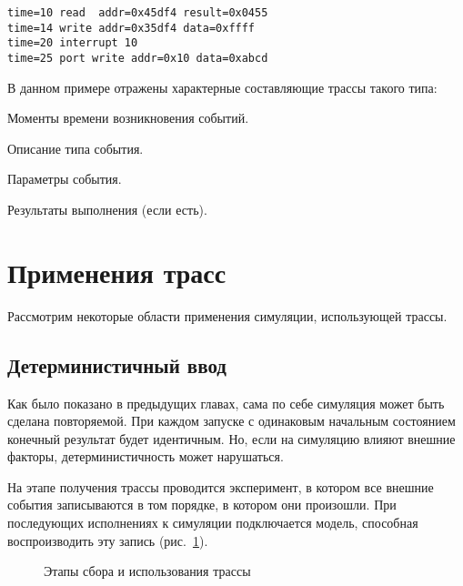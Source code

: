 \begin{lstlisting}
time=10 read  addr=0x45df4 result=0x0455
time=14 write addr=0x35df4 data=0xffff
time=20 interrupt 10
time=25 port write addr=0x10 data=0xabcd
\end{lstlisting}

В данном примере отражены характерные составляющие трассы такого типа:
\begin{itemize*}
    \item Моменты времени возникновения событий.
    \item Описание типа события.
    \item Параметры события.
    \item Результаты выполнения (если есть).
\end{itemize*}

\section{Применения трасс}

Рассмотрим некоторые области применения симуляции, использующей трассы.

\subsection{Детерминистичный ввод}

Как было показано в предыдущих главах, сама по себе симуляция может быть сделана повторяемой. При каждом запуске с одинаковым начальным состоянием конечный результат будет идентичным. Но, если на симуляцию влияют внешние факторы, детерминистичность может нарушаться.

На этапе получения трассы проводится эксперимент, в котором все внешние события записываются в том порядке, в котором они произошли. При последующих исполнениях к симуляции подключается модель, способная воспроизводить эту запись (рис.~\ref{fig:trace-collection}).

\begin{figure}[htp]
    \centering
    \caption[Этапы сбора и использования трассы]{Этапы сбора и использования трассы}
    \label{fig:trace-collection}
\end{figure}


